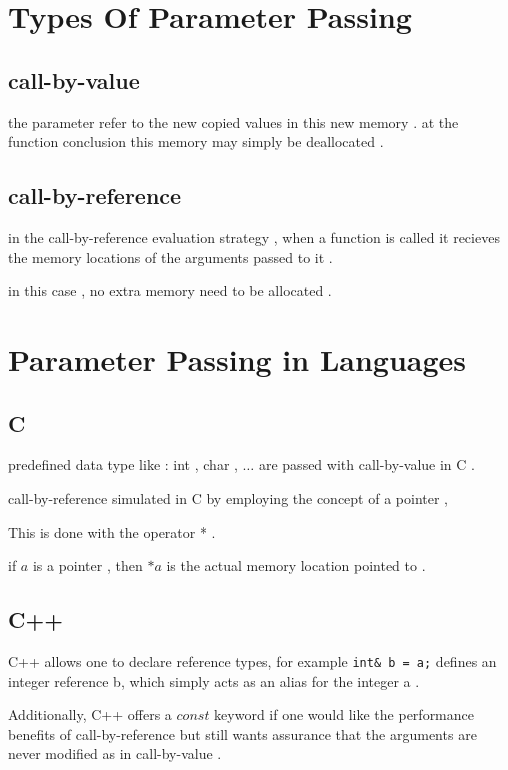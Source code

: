 \documentclass[12pt]{article}
\begin{document}
\section{Types Of Parameter Passing}

\subsection{call-by-value}

the parameter refer to the new copied values in this new memory . at the function conclusion this memory may simply be deallocated .



\subsection{call-by-reference}

in the call-by-reference evaluation strategy , when a function is called it recieves the memory locations of the arguments passed to it .

in this case , no extra memory need to be allocated .


\section{Parameter Passing in Languages}


\subsection{C}

predefined data type like : int , char , $\dots$ are passed with call-by-value in C .

call-by-reference simulated in C by employing the concept of a pointer , 

This is done with the operator * .

if $a$ is a pointer , then $*a$ is the actual memory location pointed to .


\subsection{C++}

C++ allows one to declare reference types, for example 
\lstinline{int& b = a;}
defines an integer reference b, which simply acts as an alias for the integer a .


Additionally, C++ offers a $const$ keyword if one would like the performance benefits of call-by-reference but still wants assurance that the arguments are never modified as in call-by-value .
\end{document}
